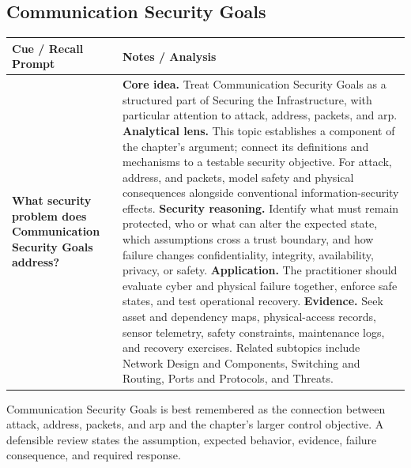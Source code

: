 \documentclass[11pt]{article}
\newcommand{\CornellHeader}{%
\rowcolor{Navy}\color{white}\bfseries Cue / Recall Prompt & \color{white}\bfseries Notes / Analysis\\\hline}
\newcommand{\CornellRow}[2]{%
\cellcolor{CueGray}\RaggedRight\textbf{#1} & \RaggedRight #2\\\hline}
\begin{document}
\subsection*{Communication Security Goals}
\begin{longtable}{>{\RaggedRight\arraybackslash}p{}|>{\RaggedRight\arraybackslash}p{}}
\CornellHeader
\CornellRow{What security problem does Communication Security Goals address?}{\textbf{Core idea.} Treat Communication Security Goals as a structured part of Securing the Infrastructure, with particular attention to attack, address, packets, and arp. \textbf{Analytical lens.} This topic establishes a component of the chapter's argument; connect its definitions and mechanisms to a testable security objective. For attack, address, and packets, model safety and physical consequences alongside conventional information-security effects. \textbf{Security reasoning.} Identify what must remain protected, who or what can alter the expected state, which assumptions cross a trust boundary, and how failure changes confidentiality, integrity, availability, privacy, or safety. \textbf{Application.} The practitioner should evaluate cyber and physical failure together, enforce safe states, and test operational recovery. \textbf{Evidence.} Seek asset and dependency maps, physical-access records, sensor telemetry, safety constraints, maintenance logs, and recovery exercises. Related subtopics include Network Design and Components, Switching and Routing, Ports and Protocols, and Threats.}
\end{longtable}
\begin{topicsummary}
Communication Security Goals is best remembered as the connection between attack, address, packets, and arp and the chapter's larger control objective. A defensible review states the assumption, expected behavior, evidence, failure consequence, and required response.
\end{topicsummary}
\end{document}
